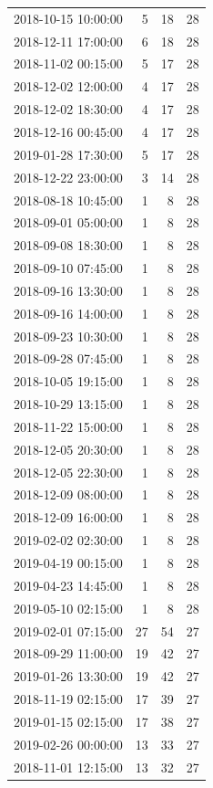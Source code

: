 \begin{tabular}{lrrr}
2018-10-15 10:00:00 & 5 & 18 & 28 \\
2018-12-11 17:00:00 & 6 & 18 & 28 \\
2018-11-02 00:15:00 & 5 & 17 & 28 \\
2018-12-02 12:00:00 & 4 & 17 & 28 \\
2018-12-02 18:30:00 & 4 & 17 & 28 \\
2018-12-16 00:45:00 & 4 & 17 & 28 \\
2019-01-28 17:30:00 & 5 & 17 & 28 \\
2018-12-22 23:00:00 & 3 & 14 & 28 \\
2018-08-18 10:45:00 & 1 & 8 & 28 \\
2018-09-01 05:00:00 & 1 & 8 & 28 \\
2018-09-08 18:30:00 & 1 & 8 & 28 \\
2018-09-10 07:45:00 & 1 & 8 & 28 \\
2018-09-16 13:30:00 & 1 & 8 & 28 \\
2018-09-16 14:00:00 & 1 & 8 & 28 \\
2018-09-23 10:30:00 & 1 & 8 & 28 \\
2018-09-28 07:45:00 & 1 & 8 & 28 \\
2018-10-05 19:15:00 & 1 & 8 & 28 \\
2018-10-29 13:15:00 & 1 & 8 & 28 \\
2018-11-22 15:00:00 & 1 & 8 & 28 \\
2018-12-05 20:30:00 & 1 & 8 & 28 \\
2018-12-05 22:30:00 & 1 & 8 & 28 \\
2018-12-09 08:00:00 & 1 & 8 & 28 \\
2018-12-09 16:00:00 & 1 & 8 & 28 \\
2019-02-02 02:30:00 & 1 & 8 & 28 \\
2019-04-19 00:15:00 & 1 & 8 & 28 \\
2019-04-23 14:45:00 & 1 & 8 & 28 \\
2019-05-10 02:15:00 & 1 & 8 & 28 \\
2019-02-01 07:15:00 & 27 & 54 & 27 \\
2018-09-29 11:00:00 & 19 & 42 & 27 \\
2019-01-26 13:30:00 & 19 & 42 & 27 \\
2018-11-19 02:15:00 & 17 & 39 & 27 \\
2019-01-15 02:15:00 & 17 & 38 & 27 \\
2019-02-26 00:00:00 & 13 & 33 & 27 \\
2018-11-01 12:15:00 & 13 & 32 & 27 \\

\end{tabular}
